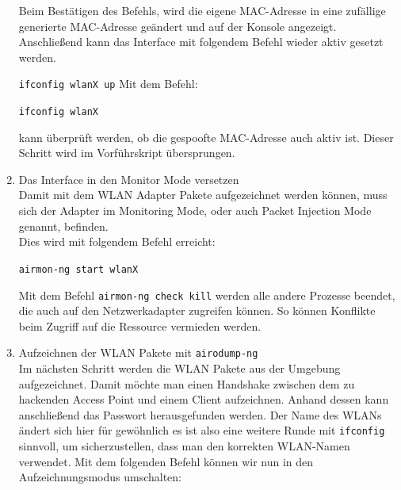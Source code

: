 \begin{enumerate}
	Beim Bestätigen des Befehls, wird die eigene MAC-Adresse in eine zufällige generierte MAC-Adresse geändert und auf der Konsole angezeigt. Anschließend kann das Interface mit folgendem Befehl wieder aktiv gesetzt werden.

	\colorbox{altgray}{\lstinline|ifconfig wlanX up|}\newline
	\newline
	Mit dem Befehl: \newline

	\colorbox{altgray}{\lstinline|ifconfig wlanX|}\newline

	kann überprüft werden, ob die gespoofte MAC-Adresse auch aktiv ist.\newline
	Dieser Schritt wird im Vorführskript übersprungen.

	\item {Das Interface in den Monitor Mode versetzen} \\
	Damit mit dem WLAN Adapter Pakete aufgezeichnet werden können, muss sich der Adapter im Monitoring Mode, oder auch Packet Injection Mode genannt, befinden. \\
	Dies wird mit folgendem Befehl erreicht:

	\colorbox{altgray}{\lstinline|airmon-ng start wlanX|}\newline

	Mit dem Befehl \newline
	\colorbox{altgray}{\lstinline|airmon-ng check kill|}\newline \newline
	werden alle andere Prozesse beendet, die auch auf den Netzwerkadapter zugreifen können. So können Konflikte beim Zugriff auf die Ressource vermieden werden.\newline

	\item {Aufzeichnen der WLAN Pakete mit \colorbox{altgray}{\lstinline|airodump-ng|}}\\
	Im nächsten Schritt werden die WLAN Pakete aus der Umgebung aufgezeichnet. Damit möchte man einen Handshake zwischen dem zu hackenden Access Point und einem Client aufzeichnen. Anhand dessen kann anschließend das Passwort herausgefunden werden. Der Name des WLANs ändert sich hier für gewöhnlich es ist also eine weitere Runde mit \colorbox{altgray}{\lstinline|ifconfig|} sinnvoll, um sicherzustellen, dass man den korrekten WLAN-Namen verwendet. Mit dem folgenden Befehl können wir nun in den Aufzeichnungsmodus umschalten: \newline


\end{enumerate}
